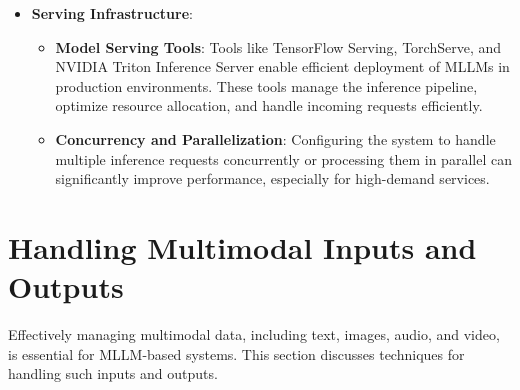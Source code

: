 \begin{itemize}
    \item \textbf{Serving Infrastructure}:
    \begin{itemize}
        \item \textbf{Model Serving Tools}: Tools like TensorFlow Serving, TorchServe, and NVIDIA Triton Inference Server enable efficient deployment of MLLMs in production environments. These tools manage the inference pipeline, optimize resource allocation, and handle incoming requests efficiently.
        \item \textbf{Concurrency and Parallelization}: Configuring the system to handle multiple inference requests concurrently or processing them in parallel can significantly improve performance, especially for high-demand services.
    \end{itemize}
\end{itemize}

\section{Handling Multimodal Inputs and Outputs}

Effectively managing multimodal data, including text, images, audio, and video, is essential for MLLM-based systems. This section discusses techniques for handling such inputs and outputs.

